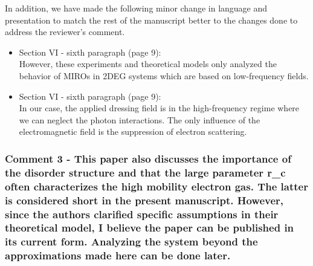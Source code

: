 \documentclass{article}
\begin{document}
In addition, we have made the following minor change in language and presentation to match the rest of the manuscript better to the changes done to address the reviewer’s comment.

\begin{itemize}
  \item Section VI - sixth paragraph (page 9):\\
  {\color{Red}
  However, these experiments and theoretical models only analyzed the behavior of MIROs in 2DEG systems which are based on low-frequency fields.
  }
  \item Section VI - sixth paragraph (page 9):\\
  {\color{Red} In our case, the applied dressing field is in the high-frequency regime where we can neglect the photon interactions. The only influence of the electromagnetic field is the suppression of electron scattering.}
\end{itemize}


\subsubsection*{Comment 3 -
\color{RoyalBlue} This paper also discusses the importance of the disorder structure and that the large parameter r\_c often characterizes the high mobility electron gas. The latter is considered short in the present manuscript. However, since the authors clarified specific assumptions in their theoretical model, I believe the paper can be published in its current form. Analyzing the system beyond the approximations made here can be done later.}
\end{document}
